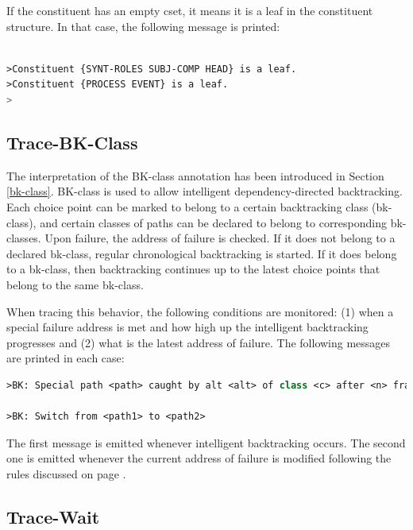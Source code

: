 \documentclass[10pt,a4paper]{report}
\begin{document}
If the constituent has an empty cset, it means it is a leaf in the
constituent structure.  In that case, the following message is printed:

\begin{lstlisting}[language=Lisp]

>Constituent {SYNT-ROLES SUBJ-COMP HEAD} is a leaf.
>Constituent {PROCESS EVENT} is a leaf.
>

\end{lstlisting}


\subsection{Trace-BK-Class}

The interpretation of the BK-class annotation has been introduced in
Section \ref{bk-class}.  BK-class is used to allow intelligent
dependency-directed backtracking.  Each choice point can be marked to
belong to a certain backtracking class (bk-class), and certain classes of
paths can be declared to belong to corresponding bk-classes.  Upon failure,
the address of failure is checked.  If it does not belong to a declared
bk-class, regular chronological backtracking is started.  If it does belong
to a bk-class, then backtracking continues up to the latest choice points
that belong to the same bk-class.

When tracing this behavior, the following conditions are monitored: (1)
when a special failure address is met and how high up the intelligent
backtracking progresses and (2) what is the latest address of failure.  
The following messages are printed in each case:

\begin{lstlisting}[language=Lisp]
>BK: Special path <path> caught by alt <alt> of class <c> after <n> frames.

>BK: Switch from <path1> to <path2>
\end{lstlisting}

The first message is emitted whenever intelligent backtracking occurs.  The
second one is emitted whenever the current address of failure is modified
following the rules discussed on page \pageref{fig4:bkclass1}.



\subsection{Trace-Wait}
\end{document}
